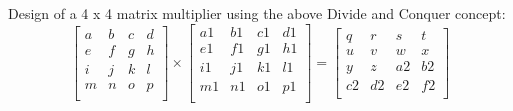 \documentclass[12pt]{report}
\begin{document}
Design of a 4 x 4 matrix multiplier using the above Divide and Conquer concept:
$$
\begin{bmatrix} 
a & b & c & d\\
e & f & g & h\\
i & j & k & l\\
m & n & o & p\\
\end{bmatrix}
\times
\begin{bmatrix} 
a1 & b1 & c1 & d1\\
e1 & f1 & g1 & h1\\
i1 & j1 & k1 & l1\\
m1 & n1 & o1 & p1\\
\end{bmatrix}
=
\begin{bmatrix} 
q & r & s & t\\
u & v & w & x\\
y & z & a2 & b2\\
c2 & d2 & e2 & f2\\
\end{bmatrix}
$$
\vfill
\clearpage
\end{document}
